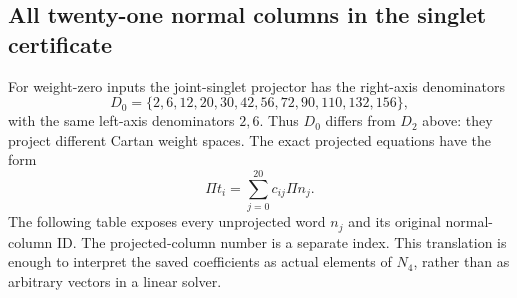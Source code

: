 \subsection{All twenty-one normal columns in the singlet certificate}
\label{expfinite:projected-columns}

For weight-zero inputs the joint-singlet projector has the right-axis
denominators
\[
D_0=\{2,6,12,20,30,42,56,72,90,110,132,156\},
\]
with the same left-axis denominators $2,6$. Thus $D_0$ differs from
$D_2$ above: they project different Cartan weight spaces. The exact
projected equations have the form
\[
 \Pi t_i=\sum_{j=0}^{20}c_{ij}\Pi n_j.
\]
The following table exposes every unprojected word $n_j$ and its
original normal-column ID. The projected-column number is a separate
index. This translation is enough to interpret the saved coefficients
as actual elements of $N_4$, rather than as arbitrary vectors in a
linear solver.

